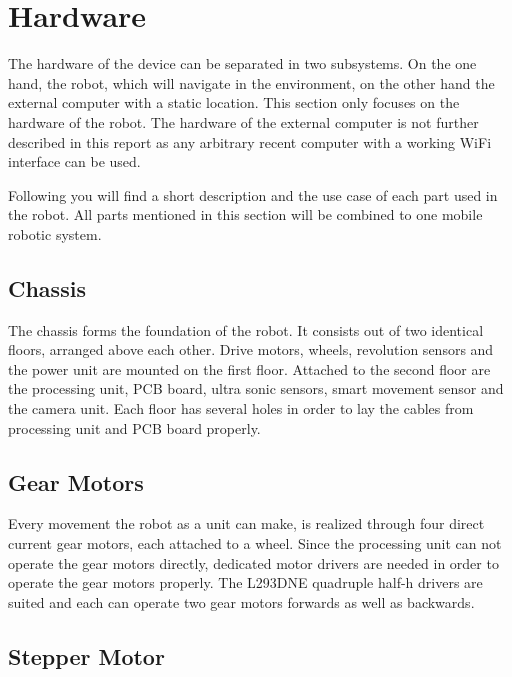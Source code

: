 \newpage

\section{Hardware}

The hardware of the device can be separated in two subsystems. On the one hand, the robot, which will navigate in the environment, on the other hand the external computer with a static location. This section only focuses on the hardware of the robot. The hardware of the external computer is not further described in this report as any arbitrary recent computer with a working WiFi interface can be used.

Following you will find a short description and the use case of each part used in the robot. All parts mentioned in this section will be combined to one mobile robotic system.

\subsection{Chassis}\label{subsec:chassis}

The chassis forms the foundation of the robot. It consists out of two identical floors, arranged above each other. Drive motors, wheels, revolution sensors and the power unit are mounted on the first floor. Attached to the second floor are the processing unit, PCB board, ultra sonic sensors, smart movement sensor and the camera unit. Each floor has several holes in order to lay the cables from processing unit and PCB board properly.

\subsection{Gear Motors}\label{subsec:gear_motors}

Every movement the robot as a unit can make, is realized through four direct current gear motors, each attached to a wheel. Since the processing unit can not operate the gear motors directly, dedicated motor drivers are needed in order to operate the gear motors properly. The L293DNE quadruple half-h drivers \cite{l293dne} are suited and each can operate two gear motors forwards as well as backwards. 

\subsection{Stepper Motor}\label{subsec:stepper_motor}

